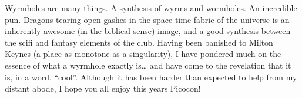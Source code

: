 

\begingroup
\setlength{\parskip}{7pt}  
Wyrmholes are many things. A synthesis of wyrms and wormholes. An incredible pun. Dragons tearing open gashes in the space-time fabric of the universe is an inherently awesome (in the biblical sense) image, and a good synthesis between the scifi and fantasy elements of the club. Having been banished to Milton Keynes (a place as monotone as a singularity), I have pondered much on the essence of what a wyrmhole exactly is… and have come to the revelation that it is, in a word, “cool”. Although it has been harder than expected to help from my distant abode, I hope you all enjoy this years Picocon!

\endgroup